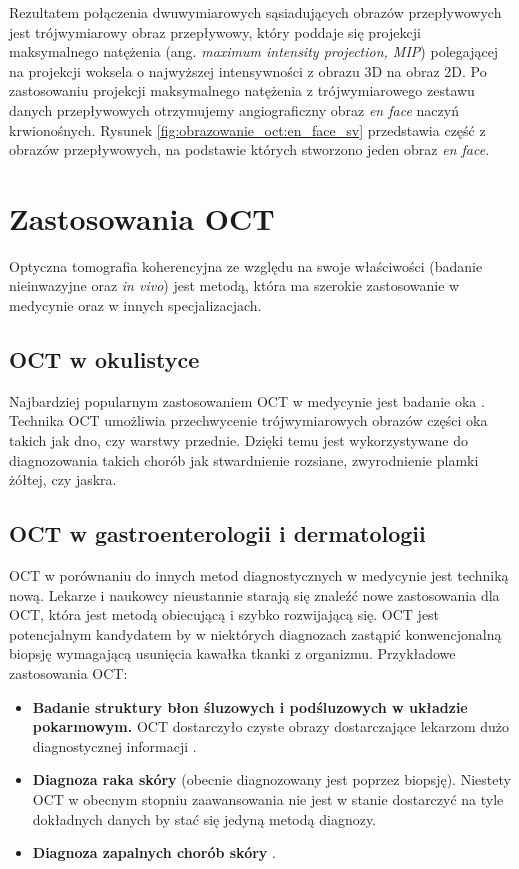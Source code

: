 Rezultatem połączenia dwuwymiarowych sąsiadujących obrazów przepływowych jest trójwymiarowy obraz przepływowy, który poddaje się projekcji maksymalnego natężenia (ang. \textit{maximum intensity projection, MIP}) polegającej na projekcji woksela o najwyższej intensywności z obrazu 3D na obraz 2D. Po zastosowaniu projekcji maksymalnego natężenia z trójwymiarowego zestawu danych przepływowych otrzymujemy angiograficzny obraz \textit{en face} naczyń krwionośnych. Rysunek \ref{fig:obrazowanie_oct:en_face_sv} przedstawia część z obrazów przepływowych, na podstawie których stworzono jeden obraz \textit{en face}.


\section{Zastosowania OCT}
\label{sec:obrazowanie_oct:zastosowania_oct}

Optyczna tomografia koherencyjna ze względu na swoje właściwości (badanie nieinwazyjne oraz \textit{in vivo}) jest metodą, która ma szerokie zastosowanie w medycynie oraz w innych specjalizacjach.

\subsection{OCT w okulistyce}

Najbardziej popularnym zastosowaniem OCT w medycynie jest badanie oka \cite{Fercher03}. Technika OCT umożliwia przechwycenie trójwymiarowych obrazów części oka takich jak dno, czy warstwy przednie. Dzięki temu jest wykorzystywane do diagnozowania takich chorób jak stwardnienie rozsiane, zwyrodnienie plamki żółtej, czy jaskra.

\subsection{OCT w gastroenterologii i dermatologii}

OCT w porównaniu do innych metod diagnostycznych w medycynie jest techniką nową. Lekarze i naukowcy nieustannie starają się znaleźć nowe zastosowania dla OCT, która jest metodą obiecującą i szybko rozwijającą się. OCT jest potencjalnym kandydatem by w niektórych diagnozach zastąpić konwencjonalną biopsję wymagającą usunięcia kawałka tkanki z organizmu. Przykładowe zastosowania OCT:

\begin{itemize}
\item \textbf{Badanie struktury błon śluzowych i podśluzowych w układzie pokarmowym.} OCT dostarczyło czyste obrazy dostarczające lekarzom dużo diagnostycznej informacji \cite{Rollins:99}.
\item \textbf{Diagnoza raka skóry} (obecnie diagnozowany jest poprzez biopsję). Niestety OCT w obecnym stopniu zaawansowania nie jest w stanie dostarczyć na tyle dokładnych danych by stać się jedyną metodą diagnozy.
\item \textbf{Diagnoza zapalnych chorób skóry} \cite{Welzel01}.
\end{itemize}

